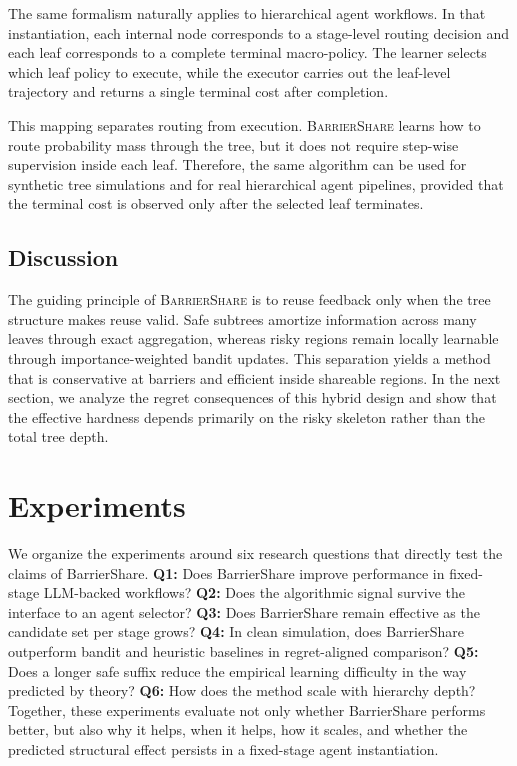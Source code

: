 \documentclass{article}
\begin{document}
The same formalism naturally applies to hierarchical agent workflows. In that instantiation, each internal node corresponds to a stage-level routing decision and each leaf corresponds to a complete terminal macro-policy. The learner selects which leaf policy to execute, while the executor carries out the leaf-level trajectory and returns a single terminal cost after completion.

This mapping separates routing from execution. \textsc{BarrierShare} learns how to route probability mass through the tree, but it does not require step-wise supervision inside each leaf. Therefore, the same algorithm can be used for synthetic tree simulations and for real hierarchical agent pipelines, provided that the terminal cost is observed only after the selected leaf terminates.

\subsection{Discussion}
\label{sec:barriershare_discussion}

The guiding principle of \textsc{BarrierShare} is to reuse feedback only when the tree structure makes reuse valid. Safe subtrees amortize information across many leaves through exact aggregation, whereas risky regions remain locally learnable through importance-weighted bandit updates. This separation yields a method that is conservative at barriers and efficient inside shareable regions. In the next section, we analyze the regret consequences of this hybrid design and show that the effective hardness depends primarily on the risky skeleton rather than the total tree depth.
\section{Experiments}

We organize the experiments around six research questions that directly test the claims of BarrierShare. 
\textbf{Q1:} Does BarrierShare improve performance in fixed-stage LLM-backed workflows? 
\textbf{Q2:} Does the algorithmic signal survive the interface to an agent selector? 
\textbf{Q3:} Does BarrierShare remain effective as the candidate set per stage grows? 
\textbf{Q4:} In clean simulation, does BarrierShare outperform bandit and heuristic baselines in regret-aligned comparison? 
\textbf{Q5:} Does a longer safe suffix reduce the empirical learning difficulty in the way predicted by theory? 
\textbf{Q6:} How does the method scale with hierarchy depth? 
Together, these experiments evaluate not only whether BarrierShare performs better, but also why it helps, when it helps, how it scales, and whether the predicted structural effect persists in a fixed-stage agent instantiation.
\end{document}
